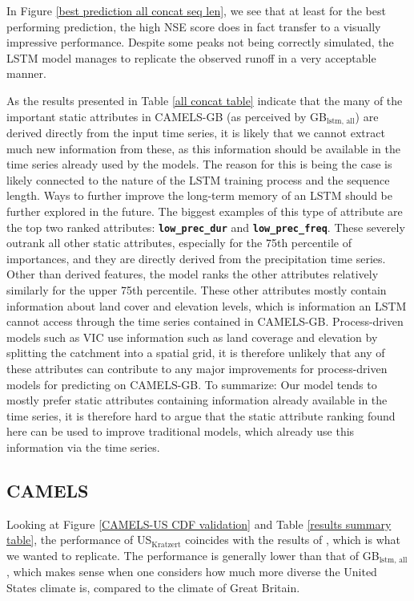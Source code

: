 In Figure \ref{best prediction all concat seq len}, we see that at least for the 
best performing prediction, the high NSE score does 
in fact transfer to a visually impressive performance. Despite some peaks not being 
correctly simulated, the LSTM model manages to replicate the observed runoff in a 
very acceptable manner.

As the results presented in Table \ref{all concat table}
indicate that the many of the important static attributes in CAMELS-GB (as perceived by 
GB$_\text{lstm, all}$) are derived directly from the 
input time series, it is likely that we cannot extract much new information from 
these, as this information should be available in the time series already used by 
the models. The reason for this is being the case is likely connected to the 
nature of the LSTM training process and the sequence length. Ways 
to further improve the long-term memory of an LSTM should be further explored 
in the future. The biggest examples of this type of attribute are the top two ranked 
attributes: \textbf{\texttt{low\_prec\_dur}} and \textbf{\texttt{low\_prec\_freq}}. 
These severely outrank all other static attributes, especially for the 75th percentile 
of importances, and they are directly derived from the precipitation time series.
Other than derived features, the model ranks the other attributes relatively similarly 
for the upper 75th percentile. These other attributes mostly contain information 
about land cover and elevation levels, which is information an LSTM cannot access 
through the time series contained in CAMELS-GB. Process-driven models such as VIC 
use information such as land coverage and elevation by splitting the catchment 
into a spatial grid, it is therefore unlikely that any of these attributes can 
contribute to any major improvements for process-driven models for predicting 
on CAMELS-GB. To summarize: Our model tends to mostly prefer static attributes 
containing information already available in the time series, it is therefore hard 
to argue that the static attribute ranking found here can be used to improve 
traditional models, which already use this information via the time series.

\subsection{CAMELS}
Looking at Figure \ref{CAMELS-US CDF validation} and Table \ref{results summary table}, 
the performance of US$_\text{Kratzert}$ coincides with the results of \citet{lstm_third_paper}, 
which is what we wanted to replicate. The performance is generally lower than that 
of GB$_\text{lstm, all}$, which makes sense when one considers how much more diverse 
the United States climate is, compared to the climate of Great Britain. 

